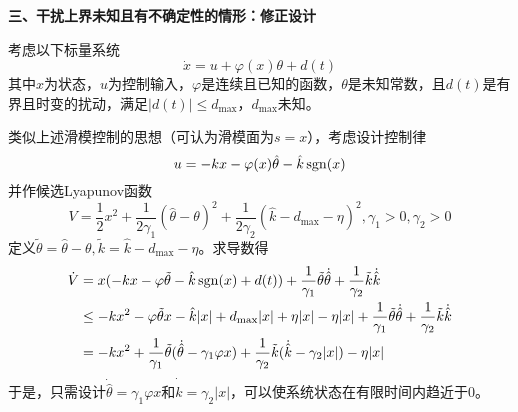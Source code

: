 \noindent\textbf{三、干扰上界未知且有不确定性的情形：修正设计}

考虑以下标量系统
\begin{equation}
    \dot{x} = u + \varphi(x)\theta + d(t)
\end{equation}
其中$x$为状态，$u$为控制输入，$\varphi$是连续且已知的函数，$\theta$是未知常数，且$d(t)$是有界且时变的扰动，满足$|d(t)|\le d_{\max}$，$d_{\max}$未知。

类似上述滑模控制的思想（可认为滑模面为$s=x$），考虑设计控制律\[u=-kx-\varphi(x)\hat{\theta}-\hat{k}\operatorname{sgn}(x)\]
并作候选Lyapunov函数\[V=\frac{1}{2}x^2+\frac{1}{2\gamma_1}(\hat{\theta}-\theta)^2+\frac{1}{2\gamma_2}(\hat{k}-d_{\max}-\eta)^2,\gamma_1>0,\gamma_2>0\]
定义$\tilde{\theta}=\hat{\theta}-\theta,\tilde{k}=\hat{k}-d_{\max}-\eta$。求导数得
\begin{align*}
    \dot{V}&=x(-kx-\varphi\tilde{\theta}-\hat{k}\operatorname{sgn}(x)+d(t))+\frac{1}{\gamma_1}\tilde{\theta}\dot{\hat{\theta}}+\frac{1}{\gamma_2}\tilde{k}\dot{\hat{k}}\\
    &\leq -kx^2-\varphi\tilde{\theta}x-\hat{k}|x|+d_{\max}|x|+\eta|x|-\eta|x|+\frac{1}{\gamma_1}\tilde{\theta}\dot{\hat{\theta}}+\frac{1}{\gamma_2}\tilde{k}\dot{\hat{k}}\\
    &=-kx^2+\frac{1}{\gamma_1}\tilde{\theta}(\dot{\hat{\theta}}-\gamma_1\varphi x)+\frac{1}{\gamma_2}\tilde{k}(\dot{\hat{k}}-\gamma_2|x|)-\eta|x|
\end{align*}
于是，只需设计$\dot{\hat{\theta}}=\gamma_1\varphi x$和$\dot{\hat{k}}=\gamma_2|x|$，可以使系统状态在有限时间内趋近于$0$。


